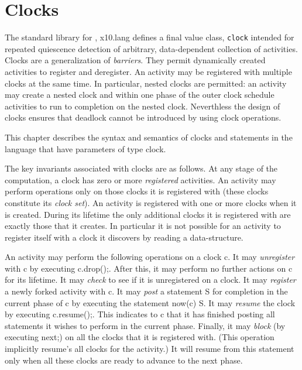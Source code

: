 \chapter{Clocks}\label{XtenClocks}
\cbstart
The standard library for \Xten{}, {\cf x10.lang} defines a {\cf final
value class}, {\tt clock} intended for repeated quiescence detection
of arbitrary, data-dependent collection of activities. Clocks are a
generalization of {\em barriers}. They permit dynamically created
activities to register and deregister. An activity may be registered
with multiple clocks at the same time. In particular, nested clocks
are permitted: an activity may create a nested clock and within one
phase of the outer clock schedule activities to run to completion on
the nested clock.  Neverthless the design of clocks ensures that
deadlock cannot be introduced by using clock operations.

This chapter describes the syntax and semantics of clocks and
statements in the language that have parameters of type {\cf clock}. 

The key invariants associated with clocks are as follows.  At any
stage of the computation, a clock has zero or more {\em registered}
activities. An activity may perform operations only on those clocks it
is registered with (these clocks constitute its {\em clock set}).  An
activity is registered with one or more clocks when it is created.
During its lifetime the only additional clocks it is registered with
are exactly those that it creates. In particular it is not possible
for an activity to register itself with a clock it discovers by
reading a data-structure.

An activity may perform the following operations on a clock {\cf
c}. It may {\em unregister} with {\cf c} by executing {\cf
c.drop();}. After this, it may perform no further actions on {\cf c}
for its lifetime. It may {\em check} to see if it is unregistered on a
clock. It may {\em register} a newly forked activity with {\cf c}.  It
may {\em post} a statement {\cf S} for completion in the current phase
of {\cf c} by executing the statement {\cf now(c) S}. It may {\em
resume} the clock by executing {\cf c.resume();}. This indicates to
{\cf c} that it has finished posting all statements it wishes to
perform in the current phase. Finally, it may {\em block} (by
executing {\cf next;}) on all the clocks that it is registered
with. (This operation implicitly {\cf resume}'s all clocks for the
activity.) It will resume from this statement only when all these
clocks are ready to advance to the next phase.

